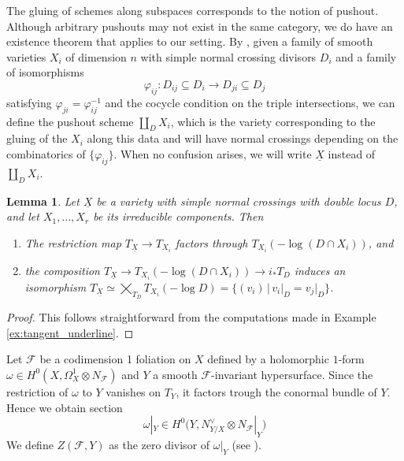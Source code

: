 \documentclass[reqno]{amsart}
\newcommand{\F}{\mathscr{F}}
\newcounter{Theorem}
\newtheorem{lemma}[theorem]{Lemma}
\theoremstyle{definition}
\theoremstyle{named}
\begin{document}
The gluing of schemes along subspaces corresponds to the notion of pushout. Although arbitrary pushouts may not exist in the same category, we do have an existence theorem that applies to our setting. By \cite[Theorem 5.4 and 7.1]{ferrand2003conducteur}, given a family of smooth varieties $X_i$ of dimension $n$ with simple normal crossing divisors $D_i$ and a family of isomorphisms 
$$ \varphi_{ij}:D_{ij}\subseteq D_i\to D_{ji}\subseteq D_j$$
    satisfying $\varphi_{ji}=\varphi_{ij}^{-1}$ and the cocycle condition on the triple intersections, we can define the pushout scheme $\coprod_D X_i$, which is the variety corresponding to the  gluing of the $X_i$ along this data and will have normal crossings depending on the combinatorics of $\{\varphi_{ij}\}$. When no confusion arises, we will write $\underline{X}$ instead of $\coprod_D X_i$.



\begin{lemma}
    Let $\underline{X}$ be a variety with simple normal crossings with double locus $D$, and let $X_1,\dots,X_r$ be its irreducible components. Then
    \begin{enumerate}
    \item The restriction map $T_{\underline{X}}\to T_{X_i}$
        factors through $T_{X_i}(-\log  (D\cap X_i))$, and
        \item the composition $T_{\underline{X}}\to T_{X_i}(-\log(D\cap X_i))\to i_*T_D$ induces an isomorphism $T_{\underline{X}} \simeq \bigtimes_{T_D}T_{X_i}(-\log D)=\{(v_i)\,\vert\, v_i\vert_D=v_j \vert_D\}$.
    \end{enumerate}
\end{lemma}
\begin{proof}
This follows straightforward from the computations made in Example \ref{ex:tangent_underline}.  
\end{proof}


Let $\F$ be a codimension 1 foliation on $X$ defined by a holomorphic $1$-form $\omega \in H^0(X,\Omega^1_X\otimes N_\F)$ and $Y$ a smooth $\F$-invariant hypersurface. Since the restriction of $\omega$ to $Y$ vanishes on $T_Y$, it factors trough the conormal bundle of $Y$. Hence we obtain section
$$\omega|_Y \in H^0\big(Y,N_{Y/X}^\vee \otimes N_\F|_Y\big)$$
We define $Z(\F,Y)$ as the zero divisor of $\omega|_Y$ (see \cite[p. 10] {pereira2024closed}).
\end{document}
